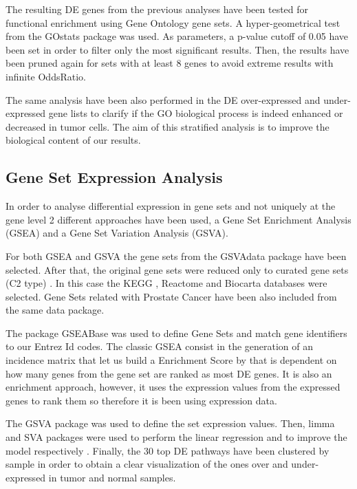 \documentclass[9pt,twocolumn,twoside]{gsajnl}
\begin{document}
The resulting DE genes from the previous analyses have been tested for functional enrichment using Gene Ontology gene sets. A hyper-geometrical test from the GOstats package \cite{GOstats} was used. As parameters, a p-value cutoff of 0.05 have been set in order to filter only the most significant results. Then, the results have been pruned again for sets with at least 8 genes to avoid extreme results with infinite OddsRatio.

The same analysis have been also performed in the DE over-expressed and under-expressed gene lists to clarify if the GO biological process is indeed enhanced or decreased in tumor cells. The aim of this stratified analysis is to improve the biological content of our results.


\subsection*{Gene Set Expression Analysis}
In order to analyse differential expression in gene sets and not uniquely at the gene level 2 different approaches have been used, a Gene Set Enrichment Analysis (GSEA) and a Gene Set Variation Analysis (GSVA).


For both GSEA and GSVA the gene sets from the GSVAdata package \cite{GSVAdata} have been selected. After that, the original gene sets were reduced only to curated gene sets  (C2 type) . In this case the KEGG  \cite{kanehisa2016kegg}, Reactome \cite{fabregat2016reactome} and   Biocarta \cite{nishimura2001biocarta} databases were selected. Gene Sets related with Prostate Cancer have been also included from the same data package.


The package GSEABase \cite{GSEABase} was used to define Gene Sets and match gene identifiers to our Entrez Id codes. The classic GSEA consist in the generation of an incidence matrix that let us build a Enrichment Score by that is dependent on how many genes from the gene set are ranked as most DE genes. It is also an enrichment approach, however, it uses the expression values from the expressed genes to rank them so therefore it is been using expression data. 

The GSVA package \cite{GSVA} was used to define the set expression values. Then, limma  \cite{limma} and SVA packages were used to perform the linear regression and to improve the model respectively \cite{leek2007capturing,svamanual} . Finally, the 30 top DE pathways have been clustered by sample in order to obtain a clear visualization of the ones over and under-expressed in tumor and normal samples.
\end{document}
